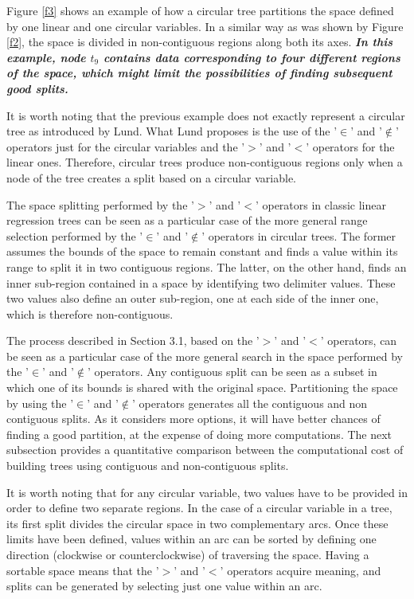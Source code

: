 \documentclass[times,twocolumn,final,authoryear]{elsarticle}
\begin{document}
Figure \ref{f3} shows an example of how a circular tree partitions the space defined by one linear and one circular variables. In a similar way as was shown by Figure \ref{f2}, the space is divided in non-contiguous regions along both its axes. \textbf{\textit{In this example, node $t_9$ contains data corresponding to four different regions of the space, which might limit the possibilities of finding subsequent good splits.}}  

It is worth noting that the previous example does not exactly represent a circular tree as introduced by Lund. What Lund proposes is the use of the '$\in$' and '$\notin$' operators just for the circular variables and the '$>$' and '$<$' operators for the linear ones. Therefore, circular trees produce non-contiguous regions only when a node of the tree creates a split based on a circular variable.

The space splitting performed by the '$>$' and '$<$' operators in classic linear regression trees can be seen as a particular case of the more general range selection performed by the '$\in$' and '$\notin$' operators in circular trees. The former assumes the bounds of the space to remain constant and finds a value within its range to split it in two contiguous regions. The latter, on the other hand, finds an inner sub-region contained in a space by identifying two delimiter values. These two values also define an outer sub-region, one at each side of the inner one, which is therefore non-contiguous.

The process described in Section 3.1, based on the '$>$' and '$<$' operators, can be seen as a particular case of the more general search in the space performed by the '$\in$' and '$\notin$' operators. Any contiguous split can be seen as a subset in which one of its bounds is shared with the original space. Partitioning the space by using the '$\in$' and '$\notin$' operators generates all the contiguous and non contiguous splits. As it considers more options, it will have better chances of finding a good partition, at the expense of doing more computations. The next subsection provides a quantitative comparison between the computational cost of building trees using contiguous and non-contiguous splits.

It is worth noting that for any circular variable, two values have to be provided in order to define two separate regions. In the case of a circular variable in a tree, its first split divides the circular space in two complementary arcs. Once these limits have been defined, values within an arc can be sorted by defining one direction (clockwise or counterclockwise) of traversing the space. Having a sortable space means that the '$>$' and '$<$' operators acquire meaning, and splits can be generated by selecting just one value within an arc.
\end{document}
